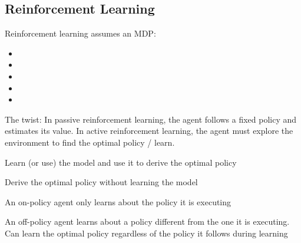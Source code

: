 \documentclass[
../EiKI_Summary.tex,
]
{subfiles}
\begin{document}
\subsection{Reinforcement Learning}
Reinforcement learning assumes an MDP:
\begin{itemize}
    \item {}
    \item {}
    \item {}
    \item {}
    \item {}
\end{itemize}

The twist: In passive reinforcement learning, the agent follows a fixed policy and estimates its value. In active reinforcement learning, the agent must explore the environment to find the optimal policy / learn.

\begin{minipage}
    [t]{0.5\textwidth}
    \begin{defbox}
        Learn (or use) the model and use it to derive the optimal policy
    \end{defbox}
\end{minipage}
\begin{minipage}
    [t]{0.5\textwidth}
    \begin{defbox}
        Derive the optimal policy without learning the model
    \end{defbox}
\end{minipage}

\begin{minipage}
    [t]{0.5\textwidth}
    \begin{defbox}
        [On-Policy]
        An on-policy agent only learns about the policy it is executing
    \end{defbox}
\end{minipage}
\begin{minipage}
    [t]{0.5\textwidth}
    \begin{defbox}
        An off-policy agent learns about a policy different from the one it is executing. Can learn the optimal policy regardless of the policy it follows during learning
    \end{defbox}
\end{minipage}
\end{document}
